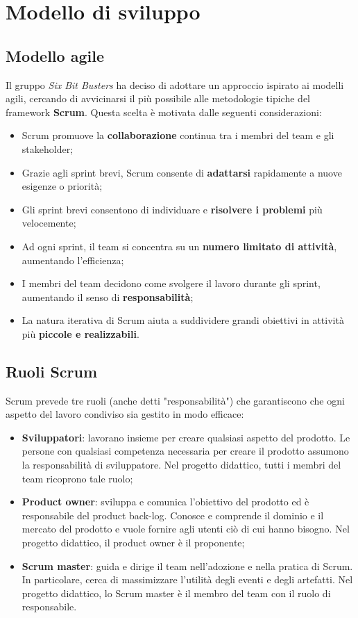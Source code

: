 \section{Modello di sviluppo}
\subsection{Modello agile}
Il gruppo \textit{Six Bit Busters} ha deciso di adottare un approccio ispirato
ai modelli agili, cercando di avvicinarsi il più possibile alle metodologie
tipiche del framework \textbf{Scrum}. Questa scelta è motivata dalle seguenti
considerazioni:
\begin{itemize}
    \item Scrum promuove la \textbf{collaborazione} continua tra i membri del team e gli
          stakeholder;
    \item Grazie agli sprint brevi, Scrum consente di \textbf{adattarsi} rapidamente a
          nuove esigenze o priorità;
    \item Gli sprint brevi consentono di individuare e \textbf{risolvere i problemi} più
          velocemente;
    \item Ad ogni sprint, il team si concentra su un \textbf{numero limitato di
              attività}, aumentando l'efficienza;
    \item I membri del team decidono come svolgere il lavoro durante gli sprint,
          aumentando il senso di \textbf{responsabilità};
    \item La natura iterativa di Scrum aiuta a suddividere grandi obiettivi in attività
          più \textbf{piccole e realizzabili}.
\end{itemize}

\subsection{Ruoli Scrum}
Scrum prevede tre ruoli (anche detti "responsabilità") che garantiscono che
ogni aspetto del lavoro condiviso sia gestito in modo efficace:
\begin{itemize}
    \item \textbf{Sviluppatori}: lavorano insieme per creare qualsiasi
          aspetto del prodotto. Le persone con qualsiasi competenza necessaria
          per creare il prodotto assumono la responsabilità di sviluppatore. Nel
          progetto didattico, tutti i membri del team ricoprono tale ruolo;
    \item \textbf{Product owner}: sviluppa e comunica l'obiettivo del prodotto
          ed è responsabile del product back-log. %
          Conosce e comprende il dominio e il
          mercato del prodotto e vuole fornire agli utenti ciò di cui hanno bisogno.
          Nel progetto didattico, il product owner è il proponente;
    \item \textbf{Scrum master}: guida e dirige il team nell'adozione e
          nella pratica di Scrum. In particolare, cerca di massimizzare l'utilità
          degli eventi e degli artefatti. Nel progetto didattico, lo Scrum master è
          il membro del team con il ruolo di responsabile.
\end{itemize}

